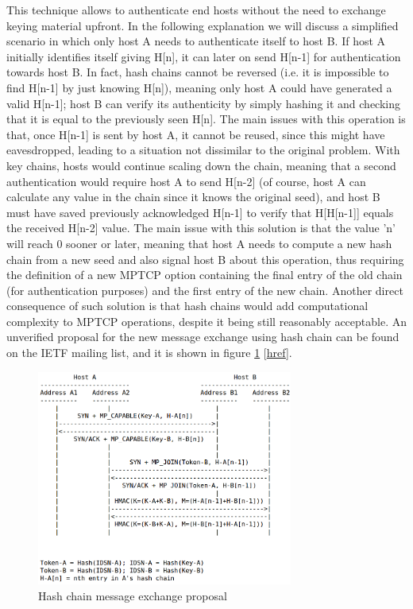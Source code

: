   This technique allows to authenticate end hosts without the need to exchange keying material upfront. In the following explanation we will discuss a simplified scenario in which only host A needs to authenticate itself to host B. If host A initially identifies itself giving H[n], it can later on send H[n-1] for authentication towards host B. In fact, hash chains cannot be reversed (i.e. it is impossible to find H[n-1] by just knowing H[n]), meaning only host A could have generated a valid H[n-1]; host B can verify its authenticity by simply hashing it and checking that it is equal to the previously seen H[n].
  The main issues with this operation is that, once H[n-1] is sent by host A, it cannot be reused, since this might have eavesdropped, leading to a situation not dissimilar to the original problem. With key chains, hosts would continue scaling down the chain, meaning that a second authentication would require host A to send H[n-2] (of course, host A can calculate any value in the chain since it knows the original seed), and host B must have saved previously acknowledged H[n-1] to verify that H[H[n-1]] equals the received H[n-2] value.
  The main issue with this solution is that the value 'n' will reach 0 sooner or later, meaning that host A needs to compute a new hash chain from a new seed and also signal host B about this operation, thus requiring the definition of a new MPTCP option containing the final entry of the old chain (for authentication purposes) and the first entry of the new chain.
  Another direct consequence of such solution is that hash chains would add computational complexity to MPTCP operations, despite it being still reasonably acceptable.
  An unverified proposal for the new message exchange using hash chain can be found on the IETF mailing list, and it is shown in figure \ref{fig:hashchain} [\href{https://www.ietf.org/mail-archive/web/multipathtcp/current/msg01275.html}{href}].
  
\begin{figure}[!htb]
\centering
\includegraphics[width=0.75\textwidth]{images/hashchain}
\caption{Hash chain message exchange proposal}
\label{fig:hashchain}
\end{figure}
  
